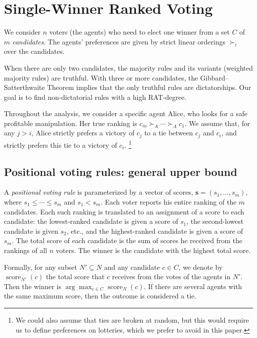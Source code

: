\section{Single-Winner Ranked Voting}\label{sec:single-winner-voting}
We consider $n$ voters (the agents) who need to elect one winner from a set $C$ of $m$ \emph{candidates}.
The agents' preferences are given by strict linear orderings $\succ_i$ over the candidates.

When there are only two candidates, the majority rules and its variants (weighted majority rules)  are truthful.
With three or more candidates, the   Gibbard--Satterthwaite Theorem implies that the only truthful rules are dictatorships. 
Our goal is to find non-dictatorial rules with a high RAT-degree.


Throughout the analysis, we consider a specific agent Alice, who looks for a safe profitable manipulation. Her true ranking is $c_m \succ_A \cdots \succ_A c_1$.
We assume that, for any $j>i$, Alice strictly prefers a victory of $c_j$ to a tie between $c_j$ and $c_i$, and strictly prefers this tie to a victory of $c_i$.%
\footnote{We could also assume that ties are broken at random, but this would require us to define preferences on lotteries, which we prefer to avoid in this paper.}




\subsection{Positional voting rules: general upper bound}
\newcommand{\scorevector}{\mathbf{s}}
\newcommand{\score}{\operatorname{score}}
A \emph{positional voting rule}
is parameterized by a vector of scores, $\scorevector=(s_1,\ldots,s_m)$, where $s_1\leq \cdots \leq  s_m$ and $s_1 < s_m$.
Each voter reports his entire ranking of the $m$ candidates. Each such ranking is translated to an assignment of a score to each candidate: the lowest-ranked candidate is given a score of $s_1$, the second-lowest candidate is given $s_2$, etc., and the highest-ranked candidate is given a score of $s_m$. 
The total score of each candidate is the sum of scores he received from the rankings of all $n$ voters. The winner is the candidate with the highest total score. 

Formally, for any subset $N'\subseteq N$ and any candidate $c\in C$, we denote by $\score_{N'}(c)$ the total score that $c$ receives from the votes of the agents in $N'$. Then the winner is $\arg\max_{c\in C}\score_N(c)$. If there are several agents with the same maximum score, then the outcome is considered a tie.

